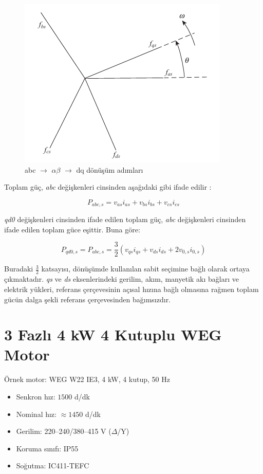 \begin{figure}[H]
    \centering
    \includegraphics[width=0.3\linewidth]{imgs/dq_transformation.png}
    \caption{abc $\rightarrow$ $\alpha\beta$ $\rightarrow$ dq dönüşüm adımları}
    \label{fig:dq_transformation}
\end{figure}

Toplam güç, \textit{abc} değişkenleri cinsinden aşağıdaki gibi ifade edilir \cite{krause2013analysis}:

\begin{equation}
    P_{abc,s} = v_{as} i_{as} + v_{bs} i_{bs} + v_{cs} i_{cs}
\end{equation}

\textit{qd0} değişkenleri cinsinden ifade edilen toplam güç, \textit{abc} değişkenleri cinsinden ifade edilen toplam güce eşittir. Buna göre:

\begin{equation}
    P_{qd0,s} = P_{abc,s} = \frac{3}{2} \left( v_{qs} i_{qs} + v_{ds} i_{ds} + 2 v_{0,s} i_{0,s} \right)
\end{equation}

Buradaki $\frac{3}{2}$ katsayısı, dönüşümde kullanılan sabit seçimine bağlı olarak ortaya çıkmaktadır. \textit{qs} ve \textit{ds} eksenlerindeki gerilim, akım, manyetik akı bağları ve elektrik yükleri, referans çerçevesinin açısal hızına bağlı olmasına rağmen toplam gücün dalga şekli referans çerçevesinden bağımsızdır.



\section{3 Fazlı 4 kW 4 Kutuplu WEG Motor} 

 

  


Örnek motor: WEG W22 IE3, 4 kW, 4 kutup, 50 Hz \begin{itemize} \item Senkron hız: $1500$ d/dk \item Nominal hız: $\approx 1450$ d/dk \item Gerilim: 220–240/380–415 V ($\Delta$/Y) \item Koruma sınıfı: IP55 \item Soğutma: IC411-TEFC \end{itemize} 

